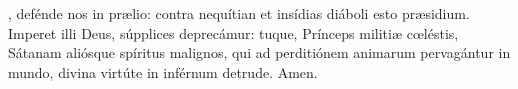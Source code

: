 , defénde nos in pr{\ae}lio: contra nequítian et insídias diáboli esto pr{\ae}sidium. Imperet illi Deus, 
súpplices deprecámur: tuque, Prínceps militi{\ae} c{\oe}léstis, Sátanam aliósque spíritus malignos, qui ad perditiónem animarum pervagántur in mundo,
divina virtúte in inférnum detrude. Amen.